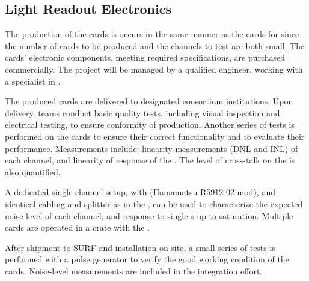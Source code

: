 \subsection{Light Readout Electronics}
\label{sec:fddp-tpc-elec-prod-lro}

The production of the   cards is %
occurs in the same manner as the cards for  since the number of cards to be produced and the channels to test are both small. The cards' electronic components, meeting required specifications, are purchased commercially. %
The project will be managed by a qualified engineer, working with a specialist in .

The produced cards are %
delivered to %
designated consortium institutions. %
Upon delivery, teams conduct basic quality tests, including visual inspection and electrical testing, to ensure conformity of production. 
Another series of tests is performed on %
the cards to ensure their correct functionality and to evaluate their performance. Measurements include: linearity measurements (DNL and INL) of each  channel, and %
linearity of response of the . The level of cross-talk on the  %
is also quantified.

A dedicated single-channel setup, with  (Hamamatsu R5912-02-mod), and identical cabling and splitter as in the , can be used to characterize the expected noise level of each channel, and response to single \phel{}s up to saturation. 
Multiple cards are operated in a  crate with the %
.

After %
shipment to SURF and installation on-site, a small series of tests is performed with a pulse generator to verify the good working condition of the cards. Noise-level measurements are %
included in the integration effort.


